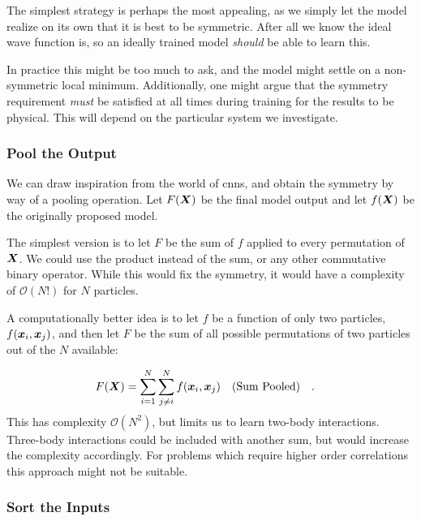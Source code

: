 \documentclass[Thesis.tex]{subfiles}
\begin{document}
The simplest strategy is perhaps the most appealing, as we simply let the model
realize on its own that  it is best to be symmetric. After all we know the ideal
wave function is, so an ideally trained model \emph{should} be able to learn
this.

In practice this might be too much to ask, and the model might settle on a
non-symmetric local minimum. Additionally, one might argue that the symmetry
requirement \emph{must} be satisfied at all times during training for the
results to be physical. This will depend on the particular system we investigate.


\subsubsection{Pool the Output}

We can draw inspiration from the world of \glspl{cnn}, and obtain the symmetry by
way of a pooling operation. Let $F(\bm{X})$ be the final model output and let
$f(\bm{X})$ be the originally proposed model.

The simplest version is to let $F$ be the sum of $f$ applied to every
permutation of $\bm{X}$. We could use the product instead of the sum, or any other
commutative binary operator. While this would fix the symmetry, it would have a
complexity of $\mathcal{O}(N!)$ for $N$ particles.

A computationally better idea is to let $f$ be a function of only two particles,
$f(\bm{x}_i, \bm{x}_j)$, and then let $F$ be the sum of all possible permutations of
two particles out of the $N$ available:

\begin{align}
  \label{eq:sum-pooling}
  F(\vX) &= \sum_{i=1}^N\sum_{j\neq i}^N f(\vx_i, \vx_j)\qq{(Sum Pooled)}.
\end{align}
This has complexity $\mathcal{O}(N^2)$, but limits us to learn
two-body interactions. Three-body interactions could be included with another
sum, but would increase the complexity accordingly. For problems which require higher
order correlations this approach might not be suitable.

\subsubsection{Sort the Inputs}
\label{sec:sorting-inputs-symmetry}
\end{document}
